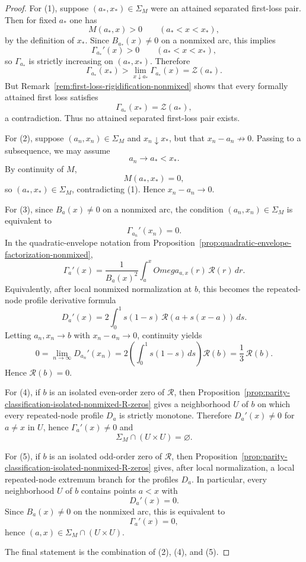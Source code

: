\documentclass[11pt,a4paper]{amsart}
\def\Omega{Omega}%
\theoremstyle{plain}
\theoremstyle{definition}
\begin{document}
\begin{proof}
For (1), suppose $(a_*,x_*)\in\Sigma_M$ were an attained separated first-loss
pair. Then for fixed $a_*$ one has
\[
M(a_*,x)>0
\qquad (a_*<x<x_*),
\]
by the definition of $x_*$. Since $B_{a_*}(x)\neq 0$ on a nonmixed arc,
this implies
\[
\Gamma_{a_*}'(x)>0
\qquad (a_*<x<x_*),
\]
so $\Gamma_{a_*}$ is strictly increasing on $(a_*,x_*)$. Therefore
\[
\Gamma_{a_*}(x_*)>\lim_{x\downarrow a_*}\Gamma_{a_*}(x)=\mathcal Z(a_*).
\]
But Remark~\ref{rem:first-loss-rigidification-nonmixed} shows that every
formally attained first loss satisfies
\[
\Gamma_{a_*}(x_*)=\mathcal Z(a_*),
\]
a contradiction. Thus no attained separated first-loss pair exists.

For (2), suppose $(a_n,x_n)\in\Sigma_M$ and $x_n\downarrow x_*$, but that
$x_n-a_n\not\to 0$. Passing to a subsequence, we may assume
\[
a_n\to a_*<x_*.
\]
By continuity of $M$,
\[
M(a_*,x_*)=0,
\]
so $(a_*,x_*)\in\Sigma_M$, contradicting (1). Hence $x_n-a_n\to 0$.

For (3), since $B_a(x)\neq 0$ on a nonmixed arc, the condition
$(a_n,x_n)\in\Sigma_M$ is equivalent to
\[
\Gamma_{a_n}'(x_n)=0.
\]
In the quadratic-envelope notation from
Proposition~\ref{prop:quadratic-envelope-factorization-nonmixed},
\[
\Gamma_a'(x)
=
\frac{1}{B_a(x)^2}\int_a^x \Omega_{a,x}(r)\,\mathcal R(r)\,dr.
\]
Equivalently, after local nonmixed normalization at $b$, this becomes the
repeated-node profile derivative formula
\[
D_a'(x)=2\int_0^1 s(1-s)\,\mathcal R(a+s(x-a))\,ds.
\]
Letting $a_n,x_n\to b$ with $x_n-a_n\to 0$, continuity yields
\[
0=\lim_{n\to\infty}D_{a_n}'(x_n)
=
2\!\left(\int_0^1 s(1-s)\,ds\right)\mathcal R(b)
=
\frac13\,\mathcal R(b).
\]
Hence $\mathcal R(b)=0$.

For (4), if $b$ is an isolated even-order zero of $\mathcal R$, then
Proposition~\ref{prop:parity-classification-isolated-nonmixed-R-zeros} gives a
neighborhood $U$ of $b$ on which every repeated-node profile $D_a$ is
strictly monotone. Therefore $D_a'(x)\neq 0$ for $a\neq x$ in $U$, hence
$\Gamma_a'(x)\neq 0$ and
\[
\Sigma_M\cap (U\times U)=\varnothing.
\]

For (5), if $b$ is an isolated odd-order zero of $\mathcal R$, then
Proposition~\ref{prop:parity-classification-isolated-nonmixed-R-zeros} gives,
after local normalization, a local repeated-node extremum branch for the
profiles $D_a$. In particular, every neighborhood $U$ of $b$ contains
points $a<x$ with
\[
D_a'(x)=0.
\]
Since $B_a(x)\neq 0$ on the nonmixed arc, this is equivalent to
\[
\Gamma_a'(x)=0,
\]
hence $(a,x)\in\Sigma_M\cap (U\times U)$.

The final statement is the combination of (2), (4), and (5).
\end{proof}
\end{document}
